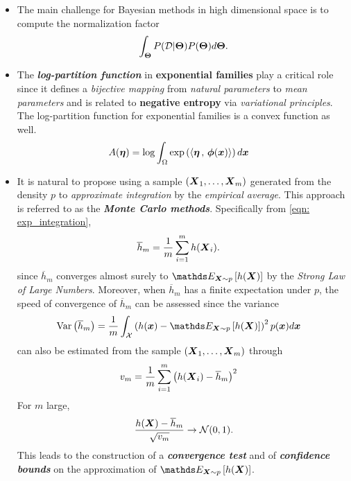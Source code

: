 \documentclass[11pt]{article}
\begin{document}
\begin{itemize}
\item The main challenge for Bayesian methods in high dimensional space is to compute the normalization factor
\begin{align*}
\int_{\boldsymbol{\Theta}} P({\mathcal D} | \boldsymbol{\Theta}) P(\boldsymbol{\Theta}) d \boldsymbol{\Theta}.
\end{align*}

\item The \textbf{\emph{log-partition function}} in \textbf{exponential families} play a critical role since it defines a \emph{bijective mapping} from \emph{natural parameters} to \emph{mean parameters} and is related to \textbf{negative entropy} via \emph{variational principles}. The log-partition function for exponential families is a convex function as well.
\begin{align*}
A(\boldsymbol{\eta}) &= \log \int_{\Omega}\exp\left(\left\langle \boldsymbol{\eta}\,,\, \boldsymbol{\phi}(\boldsymbol{x}) \right\rangle\right)d\boldsymbol{x}
\end{align*}

\item It is natural to propose using a sample $(\boldsymbol{X}_1, \ldots , \boldsymbol{X}_m)$ generated from the density $p$ to \emph{approximate integration} by the \emph{empirical average}. This approach is referred to as the \emph{\textbf{Monte Carlo methods}}. Specifically from \eqref{eqn: exp_integration}, 
\begin{align}
\overline{h}_{m} &= \frac{1}{m}\sum_{i=1}^{m}h(\boldsymbol{X}_{i}) \label{eqn: exp_integration_monte_carlo}.
\end{align} since $\overline{h}_{m}$ converges almost surely to $\E{\mb{X}\sim p}{h(\mb{X})}$ by the \emph{Strong Law of Large Numbers}. Moreover, when $\overline{h}_{m}$ has a finite expectation under $p$, the speed of convergence of $\overline{h}_{m}$ can be assessed since the variance 
\begin{align*}
\text{Var}\paren{\overline{h}_{m}} &= \frac{1}{m}\int_{\cX}\paren{h(\mb{x}) - \E{\mb{X}\sim p}{h(\mb{X})}}^{2}p(\mb{x}) d\mb{x}
\end{align*} can also be estimated from the sample $(\boldsymbol{X}_1, \ldots , \boldsymbol{X}_m)$ through
\begin{align*}
v_{m} &= \frac{1}{m}\sum_{i=1}^{m}\left(h(\boldsymbol{X}_{i}) - \overline{h}_{m}\right)^2
\end{align*}
For $m$ large,
\begin{align*}
\frac{h(\boldsymbol{X}) - \overline{h}_{m}}{\sqrt{v_{m}}} \rightarrow {\mathcal N}(0, 1).
\end{align*} This leads to the construction of a \emph{\textbf{convergence test}} and of \emph{\textbf{confidence bounds}} on the approximation of $\E{\mb{X}\sim p}{h(\mb{X})}$.

\end{itemize}
\end{document}
